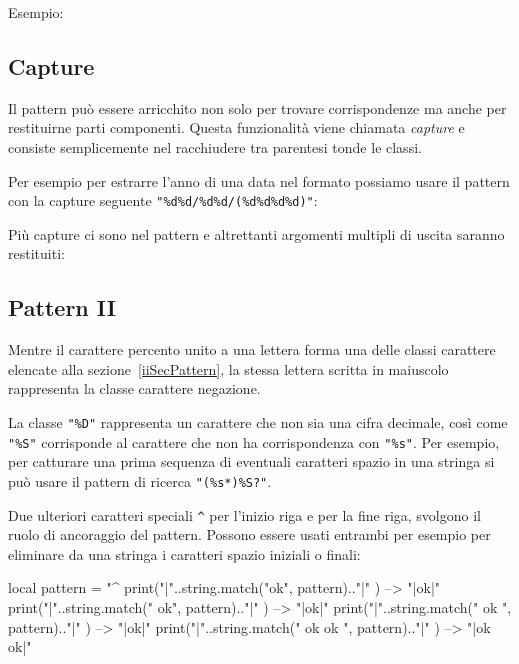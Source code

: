Esempio:

\subsection{Capture}
\label{iiSecCapture}

Il pattern può essere arricchito non solo per trovare corrispondenze ma anche
per restituirne parti componenti. Questa funzionalità viene chiamata
\emph{capture} e consiste semplicemente nel racchiudere tra parentesi tonde le
classi.

Per esempio per estrarre l'anno di una data nel formato 
possiamo usare il pattern con la capture seguente \verb|"%d%d/%d%d/(%d%d%d%d)"|:

Più capture ci sono nel pattern e altrettanti argomenti multipli di uscita
saranno restituiti:


\subsection{Pattern II}

Mentre il carattere percento unito a una lettera forma una delle classi
carattere elencate alla sezione~\ref{iiSecPattern}, la stessa lettera scritta
in maiuscolo rappresenta la classe carattere negazione.

La classe \verb|"%D"| rappresenta un carattere che non sia una cifra decimale,
così come \verb|"%S"| corrisponde al carattere che non ha corrispondenza con
\verb|"%s"|. Per esempio, per catturare una prima sequenza di eventuali
caratteri spazio in una stringa si può usare il pattern di ricerca
\verb|"(%s*)%S?"|. 

Due ulteriori caratteri speciali \verb|^| per l'inizio riga e \key{\$} per la
fine riga, svolgono il ruolo di ancoraggio del pattern. Possono essere usati
entrambi per esempio per eliminare da una stringa i caratteri spazio iniziali o
finali:
\begin{lines}
local pattern = "^%
print("|"..string.match("ok", pattern).."|" )      --> "|ok|"
print("|"..string.match(" ok", pattern).."|" )     --> "|ok|"
print("|"..string.match(" ok ", pattern).."|" )    --> "|ok|"
print("|"..string.match(" ok ok ", pattern).."|" ) --> "|ok ok|"
\end{lines}

